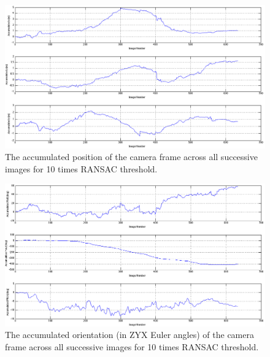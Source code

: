 \documentclass[12pt]{article} %
\begin{document}
\begin{enumerate}[label=\alph*)]
\begin{itemize}
\begin{figure}[h!]
	\centering
	\includegraphics[width=450px]{position_adjusted_thres.png}
	\caption{The accumulated position of the camera frame across all successive images for 10 times RANSAC threshold.}
	\label{pos_thres}
\end{figure}

\begin{figure}[h!]
	\centering
	\includegraphics[width=450px]{orientation_thres.png}
	\caption{The accumulated orientation (in ZYX Euler angles) of the camera frame across all successive images for 10 times RANSAC threshold.}
	\label{orient_thres}
\end{figure}

\end{itemize}

\newpage


\end{enumerate}
\end{document}
